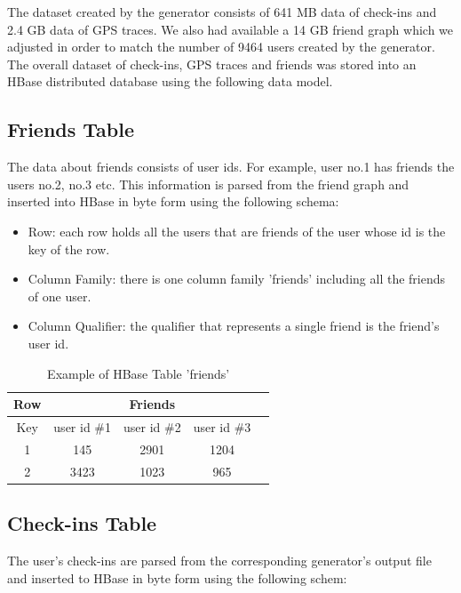 The dataset created by the generator consists of 641 MB data of check-ins and 2.4 GB data of GPS traces. We also had available a 14 GB friend graph which 
we adjusted in order to match the number of 9464 users created by the generator. The overall dataset of check-ins, GPS traces and friends was stored 
into an HBase distributed database using the following data model.

\subsection{Friends Table}

The data about friends consists of user ids. For example, user no.1 has friends the users no.2, no.3 etc. This information is parsed from the friend graph and 
inserted into HBase in byte form using the following schema:

\begin{itemize}
 \item Row: each row holds all the users that are friends of the user whose id is the key of the row.
 \item Column Family: there is one column family 'friends' including all the friends of one user.
 \item Column Qualifier: the qualifier that represents a single friend is the friend's user id.
\end{itemize}

\begin{table}[H]
\begin{center}
\begin{tabular}{|c|c|c|c|c|}
 \hline
 Row & \multicolumn{3}{|c|}{Friends} \\
 \hline
 Key & user id \#1 & user id \#2 & user id \#3 \\
 \hline
 1 & 145 & 2901 & 1204 \\ \hline 
 2 & 3423 & 1023 & 965 \\
 \hline
\end{tabular}
\end{center}
\caption{Example of HBase Table 'friends'}
\end{table}

\subsection{Check-ins Table}

The user's check-ins are parsed from the corresponding generator's output file and inserted to HBase in byte form using the following schem:

